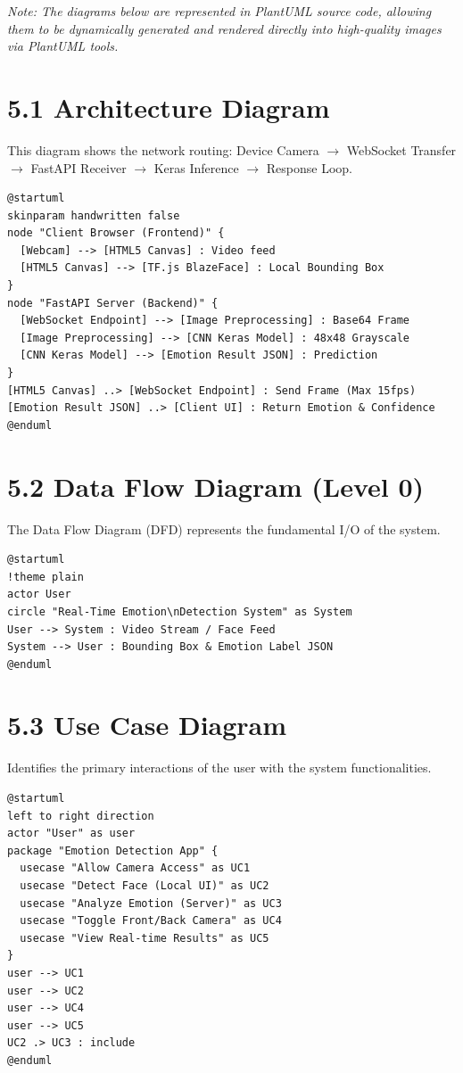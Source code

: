 \documentclass[12pt,a4paper]{report}
\begin{document}
\textit{Note: The diagrams below are represented in PlantUML source code, allowing them to be dynamically generated and rendered directly into high-quality images via PlantUML tools.}

\section*{5.1 Architecture Diagram}
This diagram shows the network routing: Device Camera $\rightarrow$ WebSocket Transfer $\rightarrow$ FastAPI Receiver $\rightarrow$ Keras Inference $\rightarrow$ Response Loop.

\begin{verbatim}
@startuml
skinparam handwritten false
node "Client Browser (Frontend)" {
  [Webcam] --> [HTML5 Canvas] : Video feed
  [HTML5 Canvas] --> [TF.js BlazeFace] : Local Bounding Box
}
node "FastAPI Server (Backend)" {
  [WebSocket Endpoint] --> [Image Preprocessing] : Base64 Frame
  [Image Preprocessing] --> [CNN Keras Model] : 48x48 Grayscale
  [CNN Keras Model] --> [Emotion Result JSON] : Prediction
}
[HTML5 Canvas] ..> [WebSocket Endpoint] : Send Frame (Max 15fps)
[Emotion Result JSON] ..> [Client UI] : Return Emotion & Confidence
@enduml
\end{verbatim}

\section*{5.2 Data Flow Diagram (Level 0)}
The Data Flow Diagram (DFD) represents the fundamental I/O of the system.

\begin{verbatim}
@startuml
!theme plain
actor User
circle "Real-Time Emotion\nDetection System" as System
User --> System : Video Stream / Face Feed
System --> User : Bounding Box & Emotion Label JSON
@enduml
\end{verbatim}

\section*{5.3 Use Case Diagram}
Identifies the primary interactions of the user with the system functionalities.

\begin{verbatim}
@startuml
left to right direction
actor "User" as user
package "Emotion Detection App" {
  usecase "Allow Camera Access" as UC1
  usecase "Detect Face (Local UI)" as UC2
  usecase "Analyze Emotion (Server)" as UC3
  usecase "Toggle Front/Back Camera" as UC4
  usecase "View Real-time Results" as UC5
}
user --> UC1
user --> UC2
user --> UC4
user --> UC5
UC2 .> UC3 : include
@enduml
\end{verbatim}
\end{document}

